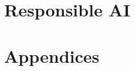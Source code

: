 \documentclass[11pt,twoside]{book}
\theoremstyle{definition}
\theoremstyle{plain}
\begin{document}
\part{Responsible AI}



\appendix
\part{Appendices}



\backmatter
\end{document}
